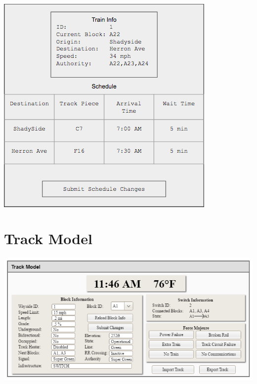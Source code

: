 \documentclass{scrreprt}
\begin{document}
\includegraphics[width=\textwidth]{CTC-pop}

\chapter{Track Model}

\includegraphics[width=\textwidth]{track-model}
\end{document}
